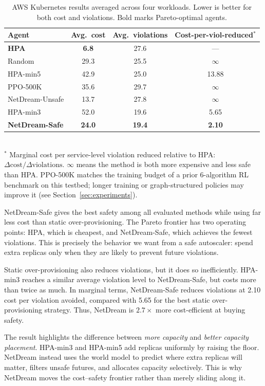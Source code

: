 \begin{table}[t]
\centering
\small
\caption{AWS Kubernetes results averaged across four workloads.
Lower is better for both cost and violations. Bold marks Pareto-optimal
agents.}
\label{tab:eks-summary}
\begin{tabular}{@{}lccc@{}}
\toprule
Agent & Avg.\ cost & Avg.\ violations & Cost-per-viol-reduced$^{*}$ \\
\midrule
\textbf{HPA}             & \textbf{6.8}  & 27.6 & --- \\
Random                   & 29.3 & 25.5 & $\infty$ \\
HPA-min5                 & 42.9 & 25.0 & 13.88 \\
PPO-500K                 & 35.6 & 29.7 & $\infty$ \\
NetDream-Unsafe          & 13.7 & 27.8 & $\infty$ \\
HPA-min3                 & 52.0 & 19.6 & 5.65 \\
\textbf{NetDream-Safe}   & \textbf{24.0} & \textbf{19.4} & \textbf{2.10} \\
\bottomrule
\end{tabular}
\\[2pt]
{\footnotesize
$^{*}$ Marginal cost per service-level violation reduced relative to HPA:
$\Delta\mathrm{cost}/\Delta\mathrm{violations}$.
$\infty$ means the method is both more expensive and less safe than HPA.
PPO-500K matches the training budget of a prior 6-algorithm RL benchmark
on this testbed; longer training or graph-structured policies may
improve it (see Section~\ref{sec:experiments}).
}
\end{table}

NetDream-Safe gives the best safety among all evaluated methods while
using far less cost than static over-provisioning. The Pareto frontier
has two operating points: HPA, which is cheapest, and NetDream-Safe,
which achieves the fewest violations. This is precisely the behavior we
want from a safe autoscaler: spend extra replicas only when they are
likely to prevent future violations.

Static over-provisioning also reduces violations, but it does so
inefficiently. HPA-min3 reaches a similar average violation level to
NetDream-Safe, but costs more than twice as much. In marginal terms,
NetDream-Safe reduces violations at 2.10 cost per violation avoided,
compared with 5.65 for the best static over-provisioning strategy. Thus,
NetDream is $2.7\times$ more cost-efficient at buying safety.

The result highlights the difference between \emph{more capacity} and
\emph{better capacity placement}. HPA-min3 and HPA-min5 add replicas
uniformly by raising the floor. NetDream instead uses the world model to
predict where extra replicas will matter, filters unsafe futures, and
allocates capacity selectively. This is why NetDream moves the
cost--safety frontier rather than merely sliding along it.

